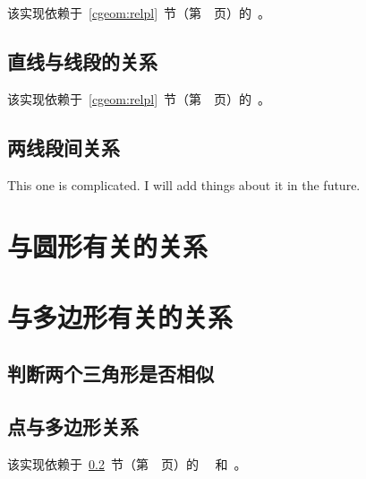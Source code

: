 该实现依赖于~\ref{cgeom:relpl}~节（第~\pageref{cgeom:relpl}~页）的~。



\subsection{直线与线段的关系}

该实现依赖于~\ref{cgeom:relpl}~节（第~\pageref{cgeom:relpl}~页）的~。



\subsection{两线段间关系}
\label{cgeom:relss}

This one is complicated. I will add things about it in the future.




\section{与圆形有关的关系}




\section{与多边形有关的关系}

\subsection{判断两个三角形是否相似}



\subsection{点与多边形关系}

该实现依赖于~\ref{cgeom:relss}~节（第~\pageref{cgeom:relss}~页）的~~
和~。




